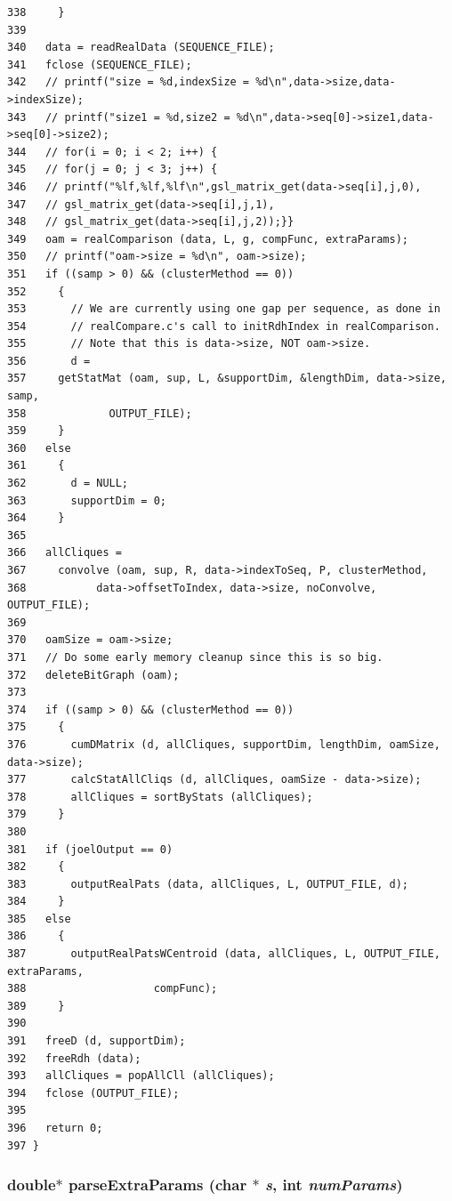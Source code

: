 \begin{verbatim}
338     }
339 
340   data = readRealData (SEQUENCE_FILE);
341   fclose (SEQUENCE_FILE);
342   // printf("size = %d,indexSize = %d\n",data->size,data->indexSize);
343   // printf("size1 = %d,size2 = %d\n",data->seq[0]->size1,data->seq[0]->size2);
344   // for(i = 0; i < 2; i++) {
345   // for(j = 0; j < 3; j++) {
346   // printf("%lf,%lf,%lf\n",gsl_matrix_get(data->seq[i],j,0),
347   // gsl_matrix_get(data->seq[i],j,1),
348   // gsl_matrix_get(data->seq[i],j,2));}}
349   oam = realComparison (data, L, g, compFunc, extraParams);
350   // printf("oam->size = %d\n", oam->size);
351   if ((samp > 0) && (clusterMethod == 0))
352     {
353       // We are currently using one gap per sequence, as done in 
354       // realCompare.c's call to initRdhIndex in realComparison.
355       // Note that this is data->size, NOT oam->size.
356       d =
357     getStatMat (oam, sup, L, &supportDim, &lengthDim, data->size, samp,
358             OUTPUT_FILE);
359     }
360   else
361     {
362       d = NULL;
363       supportDim = 0;
364     }
365 
366   allCliques =
367     convolve (oam, sup, R, data->indexToSeq, P, clusterMethod,
368           data->offsetToIndex, data->size, noConvolve, OUTPUT_FILE);
369 
370   oamSize = oam->size;
371   // Do some early memory cleanup since this is so big.
372   deleteBitGraph (oam);
373 
374   if ((samp > 0) && (clusterMethod == 0))
375     {
376       cumDMatrix (d, allCliques, supportDim, lengthDim, oamSize, data->size);
377       calcStatAllCliqs (d, allCliques, oamSize - data->size);
378       allCliques = sortByStats (allCliques);
379     }
380 
381   if (joelOutput == 0)
382     {
383       outputRealPats (data, allCliques, L, OUTPUT_FILE, d);
384     }
385   else
386     {
387       outputRealPatsWCentroid (data, allCliques, L, OUTPUT_FILE, extraParams,
388                    compFunc);
389     }
390 
391   freeD (d, supportDim);
392   freeRdh (data);
393   allCliques = popAllCll (allCliques);
394   fclose (OUTPUT_FILE);
395 
396   return 0;
397 }
\end{verbatim}
\normalsize 


\hypertarget{gemoda-r_8c_a4}{
\subsubsection[parseExtraParams]{\setlength{\rightskip}{0pt plus 5cm}double$\ast$ parse\-Extra\-Params (char $\ast$ {\em s}, int {\em num\-Params})}}
\label{gemoda-r_8c_a4}


